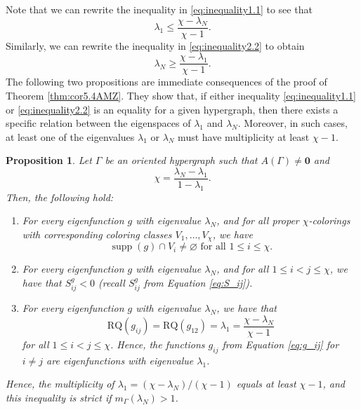 \documentclass{article}
\newcommand{\RQ}{\textrm{RQ}}
\DeclareMathOperator{\supp}{supp}
\theoremstyle{plain}
\newtheorem{proposition}[theorem]{Proposition}
\theoremstyle{definition}
\theoremstyle{remark}
\begin{document}
Note that we can rewrite the inequality in \eqref{eq:inequality1.1} to see that
\begin{equation}
\lambda_1 \leq \frac{\chi-\lambda_N}{\chi-1}.
\end{equation}
Similarly, we can rewrite the inequality in \eqref{eq:inequality2.2} to obtain
\begin{equation}
    \lambda_N\geq \frac{\chi-\lambda_1}{\chi-1}.
\end{equation}
The following two propositions are immediate consequences of the proof of Theorem \ref{thm:cor5.4AMZ}. They show that, if either inequality \eqref{eq:inequality1.1} or \eqref{eq:inequality2.2} is an equality for a given hypergraph, then there exists a specific relation between the eigenspaces of $\lambda_1$ and $\lambda_N$. Moreover, in such cases, at least one of the eigenvalues $\lambda_1$ or $\lambda_N$ must have multiplicity at least $\chi- 1$.
\begin{proposition}\label{prop:1-lambda1}
    Let $\Gamma$ be an oriented hypergraph such that $A(\Gamma)\neq \boldsymbol 0$ and $$\chi=\frac{\lambda_N-\lambda_1}{1-\lambda_1}.$$ Then, the following hold:
    \begin{enumerate}
    \item For every eigenfunction $g$ with eigenvalue $\lambda_N$, and for all proper $\chi$-colorings with corresponding coloring classes $V_1,\ldots,V_\chi$, we have
    \[
    \supp(g) \cap V_i \neq \varnothing \text{ for all } 1\leq i\leq \chi.
    \]
    \item For every eigenfunction $g$ with eigenvalue $\lambda_N$, and for all $1\leq i<j\leq \chi$, we have that $S^g_{ij}<0$ (recall $S^g_{ij}$ from Equation \eqref{eq:S_ij}).
    \item For every eigenfunction $g$ with eigenvalue $\lambda_N$, we have that $$\RQ(g_{ij}) = \RQ(g_{12})=\lambda_1 = \frac{\chi-\lambda_N}{\chi-1}$$ for all $1\leq i<j\leq \chi$. Hence, the functions $g_{ij}$ from Equation \eqref{eq:g_ij} for $i\neq j$ are eigenfunctions with eigenvalue $\lambda_1$.
\end{enumerate}
Hence, the multiplicity of $\lambda_1 = (\chi-\lambda_N)/(\chi-1)$ equals at least $\chi-1$, and this inequality is strict if $m_\Gamma(\lambda_N)>1$.
\end{proposition}
\end{document}
